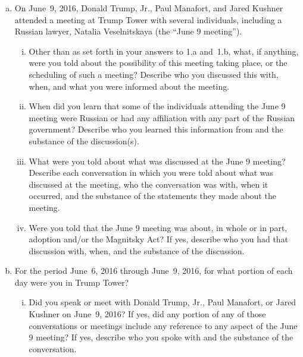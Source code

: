 \begin{enumerate}[a.]
\begin{enumerate}[i.]
\end{enumerate}

\item On June~9, 2016, Donald Trump, Jr., Paul Manafort, and Jared Kushner attended a meeting at Trump Tower with several individuals, including a Russian lawyer, Natalia Veselnitskaya (the ``June 9 meeting'').

\begin{enumerate}[i.]

\item Other than as set forth in your answers to 1.a and~1.b, what, if anything, were you told about the possibility of this meeting taking place, or the scheduling of such a meeting?
Describe who you discussed this with, when, and what you were informed about the meeting.

\item When did you learn that some of the individuals attending the June 9 meeting were Russian or had any affiliation with any part of the Russian government?
Describe who you learned this information from and the substance of the discussion(s).

\item What were you told about what was discussed at the June 9 meeting?
Describe each conversation in which you were told about what was discussed at the meeting, who the conversation was with, when it occurred, and the substance of the statements they made about the meeting.

\item Were you told that the June 9 meeting was about, in whole or in part, adoption and/or the Magnitsky Act?
If yes, describe who you had that discussion with, when, and the substance of the discussion.

\end{enumerate}

\item For the period June~6, 2016 through June~9, 2016, for what portion of each day were you in Trump Tower?

\begin{enumerate}[i.]

\item Did you speak or meet with Donald Trump, Jr., Paul Manafort, or Jared Kushner on June~9, 2016?
If yes, did any portion of any of those conversations or meetings include any reference to any aspect of the June 9 meeting?
If yes, describe who you spoke with and the substance of the conversation.

\end{enumerate}


\end{enumerate}
